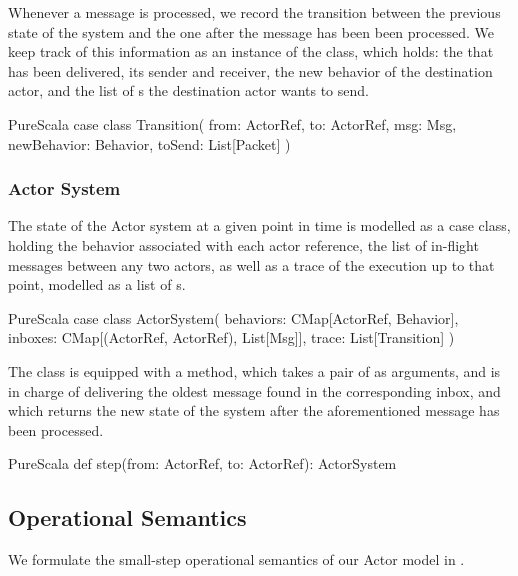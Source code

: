 Whenever a message is processed, we record the transition between the previous 
state of the system and the one after the message has been been processed. We keep 
track of this information as an instance of the  class, which 
holds: the  that has been delivered, its sender and receiver, the new 
behavior of the destination actor, and the list of s the destination 
actor wants to send.

\begin{ShortCode}{PureScala}
case class Transition(
  from: ActorRef,
  to: ActorRef,
  msg: Msg,
  newBehavior: Behavior,
  toSend: List[Packet]
)
\end{ShortCode}

\subsubsection{Actor System}

The state of the Actor system at a given point in time is modelled as a case class, 
holding the behavior associated with each actor reference, the list of in-flight messages 
between any two actors, as well as a trace of the execution up to that point, 
modelled as a list of s.

\begin{ShortCode}{PureScala}
case class ActorSystem(
  behaviors: CMap[ActorRef, Behavior],
  inboxes: CMap[(ActorRef, ActorRef), List[Msg]],
  trace: List[Transition]
)
\end{ShortCode}

The  class is equipped with a  method, which takes 
a pair of \ActorRef as arguments, and is in charge of delivering the oldest message 
found in the corresponding inbox, and which returns the new state of the system after 
the aforementioned message has been processed.

\begin{ShortCode}{PureScala}
def step(from: ActorRef, to: ActorRef): ActorSystem
\end{ShortCode}

\subsection{Operational Semantics}
\label{semantics}

We formulate the small-step operational semantics of our Actor model in .


